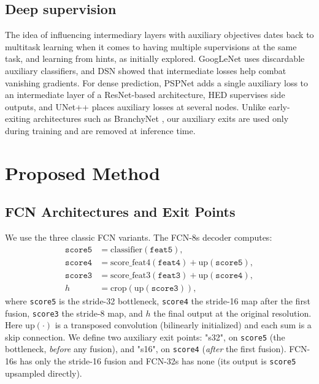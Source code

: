 \documentclass{article}
\begin{document}
    \subsection{Deep supervision}
    The idea of influencing intermediary layers with auxiliary objectives dates back to multitask learning \cite{ref_multitask} when it comes to having multiple supervisions at the same task, and learning from hints, as \cite{ref_hints} initially explored. GoogLeNet \cite{ref_googlenet} uses discardable auxiliary classifiers, and DSN \cite{ref_dsn} showed that intermediate losses help combat vanishing gradients. For dense prediction, PSPNet \cite{ref_pspnet} adds a single auxiliary loss to an intermediate layer of a ResNet-based architecture, HED \cite{ref_hed} supervises side outputs, and UNet++ \cite{ref_unetpp} places auxiliary losses at several nodes. Unlike early-exiting architectures such as BranchyNet \cite{ref_branchynet}, our auxiliary exits are used only during training and are removed at inference time.



\section{Proposed Method}

    \subsection{FCN Architectures and Exit Points}

    We use the three classic FCN variants. The FCN-8s
    decoder computes:
    \begin{align}
    \texttt{score5} &= \mathrm{classifier}(\texttt{feat5}), \\
    \texttt{score4} &= \mathrm{score\_feat4}(\texttt{feat4}) + \mathrm{up}(\texttt{score5}), \\
    \texttt{score3} &= \mathrm{score\_feat3}(\texttt{feat3}) + \mathrm{up}(\texttt{score4}), \\
    h &= \mathrm{crop}(\mathrm{up}(\texttt{score3})),
    \end{align}
    where \texttt{score5} is the stride-32 bottleneck, \texttt{score4} the
    stride-16 map after the first fusion, \texttt{score3} the stride-8 map, and
    $h$ the final output at the original resolution. Here $\mathrm{up}(\cdot)$ is
    a transposed convolution (bilinearly
    initialized) and each sum is a skip connection. We define two auxiliary exit
    points: "s32", on \texttt{score5} (the bottleneck, \emph{before} any
    fusion), and "s16", on \texttt{score4} (\emph{after} the first fusion).
    FCN-16s has only the stride-16 fusion and FCN-32s has none (its output is
    \texttt{score5} upsampled directly).
\end{document}
